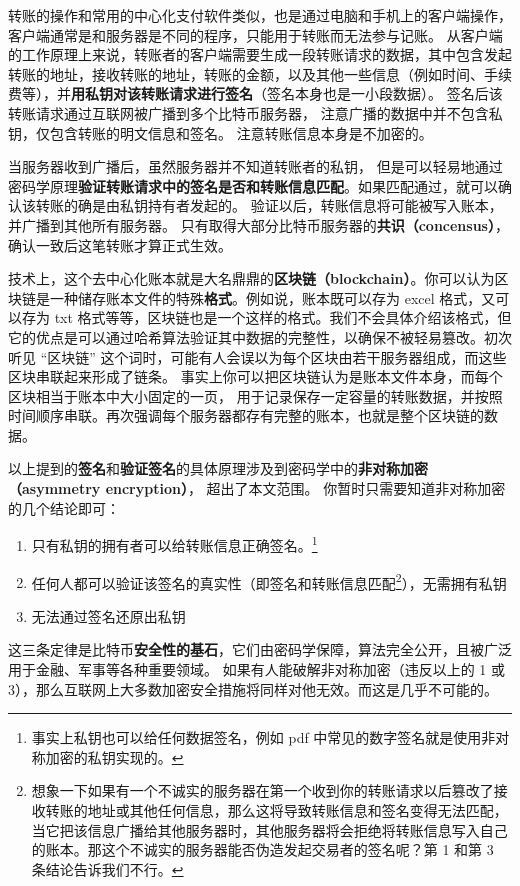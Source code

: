转账的操作和常用的中心化支付软件类似，也是通过电脑和手机上的客户端操作，客户端通常是和服务器是不同的程序，只能用于转账而无法参与记账。 从客户端的工作原理上来说，转账者的客户端需要生成一段转账请求的数据，其中包含发起转账的地址，接收转账的地址，转账的金额，以及其他一些信息（例如时间、手续费等），并\textbf{用私钥对该转账请求进行签名}（签名本身也是一小段数据）。 签名后该转账请求通过互联网被广播到多个比特币服务器， 注意广播的数据中并不包含私钥，仅包含转账的明文信息和签名。 注意转账信息本身是不加密的。

当服务器收到广播后，虽然服务器并不知道转账者的私钥， 但是可以轻易地通过密码学原理\textbf{验证转账请求中的签名是否和转账信息匹配}。如果匹配通过，就可以确认该转账的确是由私钥持有者发起的。 验证以后，转账信息将可能被写入账本，并广播到其他所有服务器。 只有取得大部分比特币服务器的\textbf{共识（concensus）}， 确认一致后这笔转账才算正式生效。

技术上，这个去中心化账本就是大名鼎鼎的\textbf{区块链（blockchain）}。你可以认为区块链是一种储存账本文件的特殊\textbf{格式}。例如说，账本既可以存为 excel 格式，又可以存为 txt 格式等等，区块链也是一个这样的格式。我们不会具体介绍该格式，但它的优点是可以通过哈希算法验证其中数据的完整性，以确保不被轻易篡改。初次听见 “区块链” 这个词时，可能有人会误以为每个区块由若干服务器组成，而这些区块串联起来形成了链条。 事实上你可以把区块链认为是账本文件本身，而每个区块相当于账本中大小固定的一页， 用于记录保存一定容量的转账数据，并按照时间顺序串联。再次强调每个服务器都存有完整的账本，也就是整个区块链的数据。

以上提到的\textbf{签名}和\textbf{验证签名}的具体原理涉及到密码学中的\textbf{非对称加密（asymmetry encryption）}， 超出了本文范围。 你暂时只需要知道非对称加密的几个结论即可：
\begin{enumerate}
\item 只有私钥的拥有者可以给转账信息正确签名。\footnote{事实上私钥也可以给任何数据签名，例如 pdf 中常见的数字签名就是使用非对称加密的私钥实现的。}
\item 任何人都可以验证该签名的真实性（即签名和转账信息匹配\footnote{想象一下如果有一个不诚实的服务器在第一个收到你的转账请求以后篡改了接收转账的地址或其他任何信息，那么这将导致转账信息和签名变得无法匹配，当它把该信息广播给其他服务器时，其他服务器将会拒绝将转账信息写入自己的账本。那这个不诚实的服务器能否伪造发起交易者的签名呢？第 1 和第 3 条结论告诉我们不行。}），无需拥有私钥
\item 无法通过签名还原出私钥
\end{enumerate}
这三条定律是比特币\textbf{安全性的基石}，它们由密码学保障，算法完全公开，且被广泛用于金融、军事等各种重要领域。 如果有人能破解非对称加密（违反以上的 1 或 3），那么互联网上大多数加密安全措施将同样对他无效。而这是几乎不可能的。

